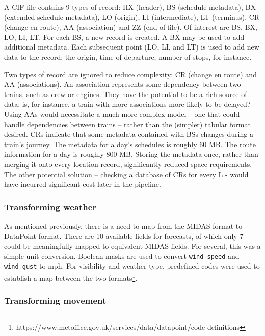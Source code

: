 \documentclass[12pt,a4paper]{article}
\begin{document}
A CIF file contains 9 types of record: HX (header), BS (schedule metadata), BX (extended schedule metadata), LO (origin), LI (intermediate), LT (terminus), CR (change en route), AA (association) and ZZ (end of file). Of interest are BS, BX, LO, LI, LT. For each BS, a new record is created. A BX may be used to add additional metadata. Each subsequent point (LO, LI, and LT) is used to add new data to the record: the origin, time of departure, number of stops, for instance. 

Two types of record are ignored to reduce complexity: CR (change en route) and AA (associations). An  association represents some dependency between two trains, such as crew or engines. They have the potential to be a rich source of data: is, for instance, a train with more associations more likely to be delayed? Using AAs would necessitate a much more complex model – one that could handle dependencies between trains – rather than the (simpler) tabular format desired. CRs indicate that some metadata contained with BSs changes during a train’s journey. The metadata for a day’s schedules is roughly 60 MB. The route information for a day is roughly 800 MB. Storing the metadata once, rather than merging it onto every location record, significantly reduced space requirements. The other potential solution – checking a database of CRs for every L  - would have incurred significant cost later in the pipeline.  

\subsubsection{Transforming weather}

As mentioned previously, there is a need to map from the MIDAS format to DataPoint format. There are 10 available fields for forecasts, of which only 7 could be meaningfully mapped to equivalent MIDAS fields. For several, this was a simple unit conversion. Boolean masks are used to convert \verb|wind_speed| and \verb|wind_gust| to mph. For visibility and weather type, predefined codes were used to establish a map between the two formats\footnote{https://www.metoffice.gov.uk/services/data/datapoint/code-definitions}. 

\subsubsection{Transforming movement}
\end{document}
